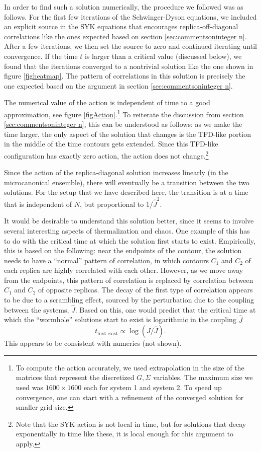 \documentclass[11pt]{article}
\newcommand{\be}{\begin{equation}}
\newcommand{\ee}{\end{equation}}
\numberwithin{equation}{section}
\begin{document}
In order to find such a  solution numerically, the procedure we followed was as follows. For the first few iterations of the Schwinger-Dyson equations, we included an explicit source in the SYK equations that encourages replica-off-diagonal correlations like the ones expected based on section \ref{sec:commentsoninteger n}. After a few iterations, we then set the source to zero and continued iterating until convergence. If the time $t$ is larger than a critical value (discussed below), we found that the iterations converged to a nontrivial solution like the one shown in figure \ref{figheatmap}. The pattern of correlations in this solution is precisely the one expected based on the argument in section \ref{sec:commentsoninteger n}. 

The numerical value of the action is independent of time to a good approximation, see figure \ref{figAction}.\footnote{To compute the action accurately, we used extrapolation in the size of the matrices that represent the discretized $G,\Sigma$ variables. The maximum size we used was $1600\times 1600$ each for system 1 and system 2. To speed up convergence, one can start with a refinement of the converged solution for smaller grid size.} To reiterate the discussion from section \ref{sec:commentsoninteger n}, this can be understood as follows: as we make the time larger, the only aspect of the solution that changes is the TFD-like portion in the middle of the time contours gets extended. Since this TFD-like configuration has exactly zero action, the action does not change.\footnote{Note that the SYK action is not local in time, but for solutions that decay exponentially in time like these, it is local enough for this argument to apply.}

Since the action of the replica-diagonal solution increases linearly (in the microcanonical ensemble), there will eventually be a transition between the two solutions. For the setup that we have described here, the transition is at a time that is independent of $N$, but proportional to $1/\hat{J}^2$.

It would be desirable to understand this solution better, since it seems to involve several interesting aspects of thermalization and chaos. One example of this has to do with the critical time at which the solution first starts to exist. Empirically, this is based on the following: near the endpoints of the contour, the solution needs to have a ``normal'' pattern of correlation, in which contours $C_1$ and $C_2$ of each replica are highly correlated with each other. However, as we move away from the endpoints, this pattern of correlation is replaced by correlation between $C_1$ and $C_2$ of opposite replicas. The decay of the first type of correlation appears to be due to a scrambling effect, sourced by the perturbation due to the coupling between the systems, $\hat{J}$. Based on this, one would predict that the critical time at which the ``wormhole'' solutions start to exist is logarithmic in the coupling $\hat{J}$
\be
t_{\text{first exist}} \propto \log(J/\widehat{J}).
\ee
This appears to be consistent with numerics (not shown).
\end{document}
